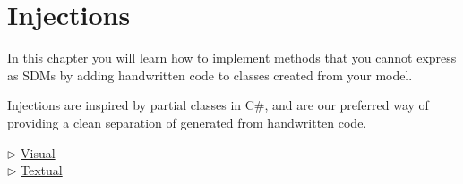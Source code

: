 \newpage
\section{Injections}
\genHeader
\hypertarget{sec:invertCard}{}

In this chapter you will learn how to implement methods that you cannot express as SDMs by adding handwritten code to classes created from your model.

Injections are inspired by partial classes in C\#, and are our preferred way of providing a clean separation of generated from handwritten code.

\begin{center} {$\triangleright$ \hyperlink{injections vis}{Visual}}%
\\ \vspace{0.5cm} {$\triangleright$ \hyperlink{injections tex}{Textual} }\end{center} 



